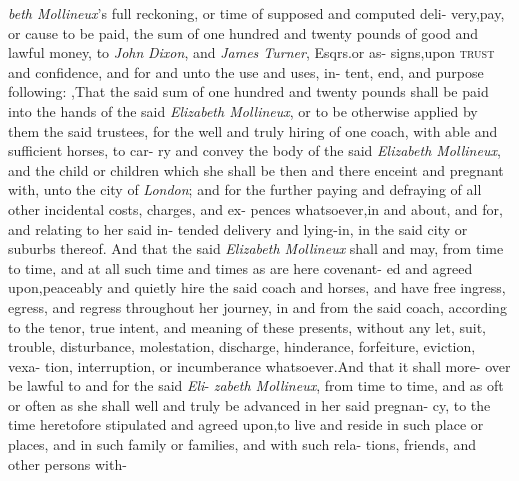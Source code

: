 \documentclass{article}
\begin{document}
\lqq \textit{beth Mollineux}’s full reckoning, or\break
\lqq time of supposed and computed deli-\break
\lqq very,\tsk pay, or cause to be paid, the\break
\lqq sum of one hundred and twenty pounds\break
\lqq of good and lawful money, to \textit{John}\break
\lqq \textit{Dixon}, and \textit{James Turner}, Esqrs.\@ or as-\break
\lqq signs,\tsk upon \textsc{trust} and confidence,\break
\lqq and for and unto the use and uses, in-\break
\lqq tent, end, and purpose following:\tsk\break
\lqq {}\hbox{},\tsk That the said sum\break
\lqq of one hundred and twenty pounds\break
\lqq shall be paid into the hands of the said\break
\lqq \textit{Elizabeth Mollineux}, or to be otherwise\break
\lqq applied by them the said trustees, for\break
\lqq the well and truly hiring of one coach,\break
\lqq with able and sufficient horses, to car-\break
\lqq ry and convey the body of the said\break
\lqq \textit{Elizabeth Mollineux}, and the child or\break
\lqq children which she shall be then and\break
\lqq there enceint and pregnant with,\tsk{}
\lqq unto the city of \textit{London}; and for the\break
\lqq further paying and defraying of all\break
\lqq other incidental costs, charges, and ex-\break
\lqq pences whatsoever,\tsk in and about,\break
\lqq and for, and relating to her said in-\break
\lqq tended delivery and lying-in, in the\break
\lqq said city or suburbs thereof. And that\break
\lqq the said \textit{Elizabeth Mollineux} shall and\break
\lqq may, from time to time, and at all such\break
\lqq time and times as are here covenant-\break
\lqq ed and agreed upon,\tsk peaceably and\break
\lqq quietly hire the said coach and horses,\break
\lqq and have free ingress, egress, and\break
\lqq regress throughout her journey, in and\break
\lqq from the said coach, according to the\break
\lqq tenor, true intent, and meaning of these\break
\lqq presents, without any let, suit, trouble,\break
\lqq disturbance, molestation, discharge,\break
\lqq hinderance, forfeiture, eviction, vexa-\break
\lqq tion, interruption, or incumberance\break
\lqq whatsoever.\tsk And that it shall more-
\lqq over be lawful to and for the said \textit{Eli}-\break
\lqq \textit{zabeth Mollineux}, from time to time,\break
\lqq and as oft or often as she shall well and\break
\lqq truly be advanced in her said pregnan-\break
\lqq cy, to the time heretofore stipulated\break
\lqq and agreed upon,\tsk to live and reside\break
\lqq in such place or places, and in such\break
\lqq family or families, and with such rela-\break
\lqq tions, friends, and other persons with-\break
\end{document}
